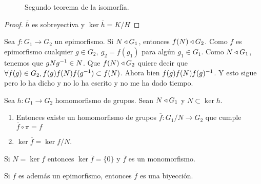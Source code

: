 \begin{figure}[h]
	\centering
	\caption{Segundo teorema de la isomorfía.}
	\label{fig:tmisomorfia2}
\end{figure}

\begin{proof}
	$\overline{h}$ es sobreyectiva y $\ker \overline{h} = K/H$
\end{proof}


\begin{thm}
	Sea $f:G_1 \to G_2$ un epimorfismo. Si $N \mathbin{\triangleleft} G_1$, entonces $f(N) \mathbin{\triangleleft} G_2$. Como $f$ es epimorfismo cualquier $g \in G_2,\ g_2 = f(g_1)$ para algún $g_1 \in G_1$. Como $N \mathbin{\triangleleft} G_1$, tenemos que $gNg^{-1} \in N$. Que $f(N) \mathbin{\triangleleft} G_2$ quiere decir que $\forall f(g) \in G_2, f(g)f(N)f(g^{-1}) \subset f(N)$. Ahora bien $f(g)f(N)f(g)^{-1}$. Y esto sigue pero lo ha dicho y no lo ha escrito y no me ha dado tiempo.
\end{thm}

\begin{lem}
	Sea $h:G_1 \to G_2$ homomorfismo de grupos. Sean $N \mathbin{\triangleleft} G_1$ y $N \subset \ker h$. 
	\begin{enumerate}
		\item Entonces existe un homomorfismo de grupos $\overline{f}:G_1/N \to G_2$ que cumple $\overline{f} \circ \pi = f$
		\item $\ker \overline{f} = \ker f / N$.
	\end{enumerate}
\end{lem}

\begin{cor}
	Si $N = \ker f$ entonces $\ker \overline{f} = \{0\}$ y $\overline{f}$ es un monomorfismo.
\end{cor}

\begin{cor} %
	Si $f$ es además un epimorfismo, entonces $\overline{f}$ es una biyección.
\end{cor}

